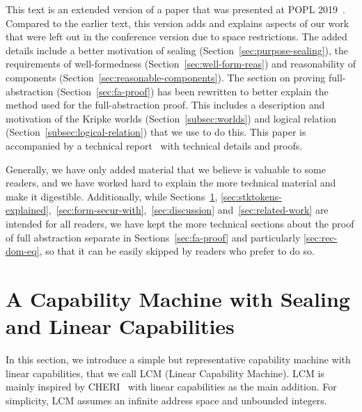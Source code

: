 \documentclass{jfp}
\newcommand{\trgcm}{\textsc{LCM}}
\newcommand{\sectionname}{Section}
\newenvironment{jversion}{}{}
\begin{document}
\begin{jversion}
  This text is an extended version of a paper that was presented at POPL 2019~\citep{skorstengaard_stktokens_2019}.
  Compared to the earlier text, this version adds and explains aspects of our work that were left out in the conference version due to space restrictions.
  The added details include a better motivation of sealing (\sectionname~\ref{sec:purpose-sealing}), the requirements of well-formedness (\sectionname~\ref{sec:well-form-reas}) and reasonability of components (\sectionname~\ref{sec:reasonable-components}).
  The section on proving full-abstraction (\sectionname~\ref{sec:fa-proof}) has been rewritten to better explain the method used for the full-abstraction proof.
  This includes a description and motivation of the Kripke worlds (\sectionname~\ref{subsec:worlds}) and logical relation (\sectionname~\ref{subsec:logical-relation}) that we use to do this.
  This paper is accompanied by a technical report~\citep{technical_report_popl} with technical details and proofs.

  Generally, we have only added material that we believe is valuable to some readers, and we have worked hard to explain the more technical material and make it digestible.
  Additionally, while Sections~\ref{sec:cap-mach-w-seal-and-lin}, \ref{sec:stktokens-explained},~\ref{sec:form-secur-with},~\ref{sec:discussion} and~\ref{sec:related-work} are intended for all readers, we have kept the more technical sections about the proof of full abstraction separate in Sections~\ref{sec:fa-proof} and particularly \ref{sec:rec-dom-eq}, so that it can be easily skipped by readers who prefer to do so.
\end{jversion}



\section{A Capability Machine with Sealing and Linear Capabilities}
\label{sec:cap-mach-w-seal-and-lin}
In this section, we introduce a simple but representative capability machine with linear capabilities, that we call \trgcm{} (Linear Capability Machine).
\trgcm{} is mainly inspired by CHERI~\citep{watson_cheri_2015} with linear capabilities as the main addition.
For simplicity, \trgcm{} assumes an infinite address space and unbounded integers.
\end{document}
